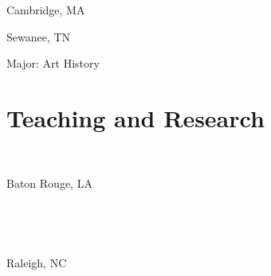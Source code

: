 \documentclass[]{baharmon-cv}
\renewcommand{\baselinestretch}{1.15}
\begin{document}
\begin{minipage}[t]{0.85\textwidth} 
\end{minipage}
\begin{minipage}[t]{0.20\textwidth} 
Cambridge, MA
\end{minipage}
\vspace*{0.1cm}

\begin{minipage}[t]{0.85\textwidth} 
\end{minipage}
\begin{minipage}[t]{0.15\textwidth} 
Sewanee, TN
\end{minipage}
Major: Art History
\vspace*{0.1cm}

\sectiondivider


\section{Teaching and Research}
\begin{minipage}[t]{0.85\textwidth}
\renewcommand{\baselinestretch}{1.75}
\\
\end{minipage}
\begin{minipage}[t]{0.15\textwidth} 
Baton Rouge, LA
\end{minipage}\\


\begin{minipage}[t]{0.85\textwidth}
\renewcommand{\baselinestretch}{1.75}
\\
\end{minipage}
\begin{minipage}[t]{0.15\textwidth} 
Raleigh, NC
\end{minipage}\\
\end{document}
